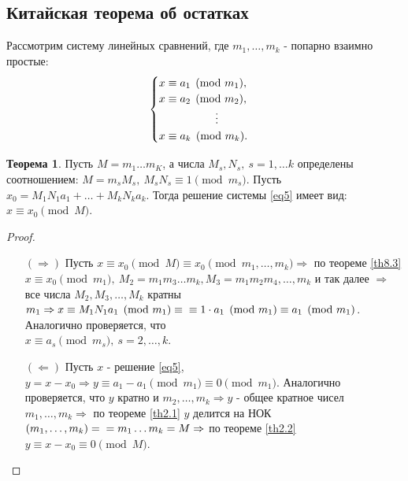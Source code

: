 \documentclass[a4paper, 12pt]{article}
\newcommand\tab[1][.5cm]{\hspace*{#1}}
\theoremstyle{definition}
\newtheorem{theorem}{Теорема}[section]
\begin{document}
    \subsection*{Китайская теорема об остатках}
    Рассмотрим систему линейных сравнений, где $m_1,\dots, m_k$ - попарно взаимно простые:
    \begin{equation}
        \begin{cases} \label{eq5}
            x\equiv a_1 \pmod{m_1},\\
            x\equiv a_2 \pmod{m_2},\\
            \tab[1.8cm] \vdots\\
            x\equiv a_k \pmod{m_k}.
        \end{cases}
    \end{equation}
    \begin{theorem}\label{th9.2}
        Пусть $M=m_1 \dots m_K$, а числа $M_s, N_s,\ s=1, \dots k$ определены соотношением: $M=m_s M_s,\ M_s N_s\equiv 1 \pmod{m_s}$. Пусть $x_0=M_1 N_1 a_1+ \dots + M_k N_k a_k$. Тогда решение системы \eqref{eq5} имеет вид: $x\equiv x_0 \pmod{M}$.
    \end{theorem} 
    \begin{proof}\tab
        \begin{itemize}
            \item[$(\Rightarrow)$] Пусть $x\equiv x_0 \pmod{M}\equiv x_0\pmod{m_1, \dots, m_k} \Rightarrow$ по теореме \ref{th8.3}\\
            $x\equiv x_0 \pmod{m_1},\ M_2=m_1 m_3 \dots m_k, M_3=m_1 m_2 m_4, \dots, m_k$ и так далее $\Rightarrow$ все числа $M_2, M_3, \dots, M_k$ кратны $m_1 \Rightarrow x\equiv M_1 N_1 a_1 \pmod{m_1}\equiv\\ \equiv 1\cdot a_1 \pmod{m_1}\equiv a_1 \pmod{m_1}$. Аналогично проверяется, что \\
            $x\equiv a_s \pmod{m_s},\ s=2, \dots, k$.
            \item[$(\Leftarrow)$] Пусть $x$ - решение \eqref{eq5}, $y=x-x_0 \Rightarrow y\equiv a_1-a_1 \pmod{m_1}\equiv 0\pmod{m_1}$. Аналогично проверяется, что $y$ кратно и $m_2, \dots, m_k \Rightarrow y$ - общее кратное чисел $m_1, \dots, m_k \Rightarrow$ по теореме \ref{th2.1} $y$ делится на НОК$(m_1, \dots, m_k)=\\=m_1 \dots m_k=M \Rightarrow$ по теореме \ref{th2.2} $y\equiv x-x_0\equiv 0\pmod{M}$.
        \end{itemize}
    \end{proof} 
\end{document}
